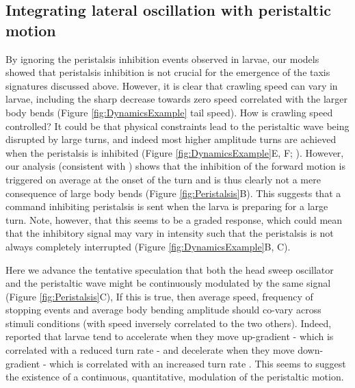 \documentclass[11pt,a4paper]{article}
\begin{document}
\subsection{Integrating lateral oscillation with peristaltic motion}
By ignoring the peristalsis inhibition events observed in larvae, our models showed that peristalsis inhibition is not crucial for the emergence of the taxis signatures discussed above. However, it is clear that crawling speed can vary in larvae, including the sharp decrease towards zero speed correlated with the larger body bends (Figure \ref{fig:DynamicsExample} tail speed). How is crawling speed controlled? It could be that physical constraints lead to the peristaltic wave being disrupted by large turns, and indeed most higher amplitude turns are achieved when the peristalsis is inhibited (Figure \ref{fig:DynamicsExample}E, F; ). However, our analysis (consistent with \citet{gepner2015computations,hernandez2015reverse}) shows that the inhibition of the forward motion is triggered on average at the onset of the turn and is thus clearly not a mere consequence of large body bends (Figure \ref{fig:Peristalsis}B).
 This suggests that a  command inhibiting peristalsis is sent when the larva is preparing for a large turn.
  Note, however, that this seems to be a graded response, which could mean that the inhibitory signal may vary in intensity such that the peristalsis is not always completely interrupted (Figure \ref{fig:DynamicsExample}B, C).

Here we advance the tentative speculation that both the head sweep oscillator and the peristaltic wave might be continuously modulated by the same signal (Figure \ref{fig:Peristalsis}C), 
If this is true, then average speed, frequency of stopping events and average body bending amplitude should co-vary across stimuli conditions (with speed inversely correlated to the two others). Indeed, \cite{gomez2014multilevel} reported that larvae tend to accelerate when they move up-gradient - which is correlated with a reduced turn rate \citep{schleyer2015learning} - and decelerate when they move down-gradient - which is correlated with an increased turn rate \citep{schleyer2015learning}. This seems to suggest the existence of a continuous, quantitative, modulation of the peristaltic motion. 
\end{document}
